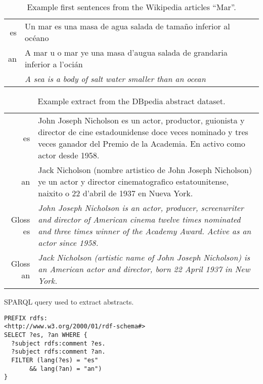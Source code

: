 \documentclass[10pt,a4paper,twocolumn]{article}
\begin{document}
  \begin{table}
  \begin{center}
  \caption{Example first sentences from the Wikipedia articles ``Mar''.\label{tab:comp}}
  \begin{tabular}{r p{5cm}}
     es & Un mar es una masa de agua salada de tamaño inferior al océano \\
     an & A mar u o mar ye una masa d'augua salada de grandaria inferior a l'ocián \\
        & {\em A sea is a body of salt water smaller than an ocean}\\
  \end{tabular}
  \end{center}
  \end{table}
  
  \begin{table}
  \begin{center}
  \caption{Example extract from the DBpedia abstract dataset.\label{tab:dbpedia}}
  \begin{tabular}{r p{5cm}}
     es & John Joseph Nicholson es un actor, productor, guionista y director de cine estadounidense doce veces nominado y tres veces ganador del Premio de la Academia. En activo como actor desde 1958. \\
     an & Jack Nicholson (nombre artistico de John Joseph Nicholson) ye un actor y director cinematografico estatounitense, naixito o 22 d'abril de 1937 en Nueva York. \\
     Gloss es   & {\em John Joseph Nicholson is an actor, producer, screenwriter and director of American cinema twelve times nominated and three times winner of the Academy Award. Active as an actor since 1958.}\\
     Gloss an   & {\em Jack Nicholson (artistic name of John Joseph Nicholson) is an American actor and director, born 22 April 1937 in New York.}
  \end{tabular}
  \end{center}
  \end{table}

\begin{table}
\begin{center}
\caption{SPARQL query used to extract abstracts.\label{tab:query}}
\begin{small}
\begin{verbatim}
PREFIX rdfs: 
<http://www.w3.org/2000/01/rdf-schema#>
SELECT ?es, ?an WHERE {
  ?subject rdfs:comment ?es.
  ?subject rdfs:comment ?an.
  FILTER (lang(?es) = "es" 
       && lang(?an) = "an")
}
\end{verbatim}
\end{small}
\end{center}
\end{table}
\end{document}
